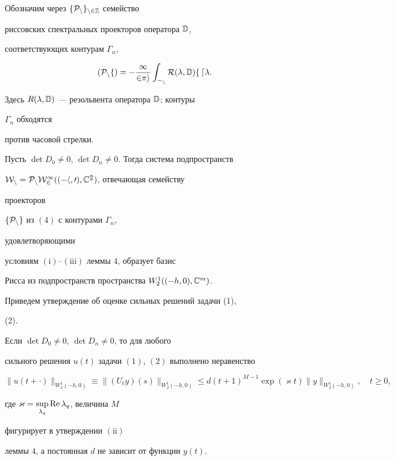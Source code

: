  


Обозначим через $\{\cal P_n\}_{n\in\Bbb Z}$ семейство 


риссовских спектральных проекторов оператора $\Bbb D$,


соответствующих контурам $\Gamma_n$,


\begin{equation} 


(\cal P_n f)=-\frac{1}{2\pi i}\int_{\Gamma_n} 


R(\lambda,\Bbb D)f\,d\lambda. 


\end{equation} 


Здесь $R(\lambda,\Bbb D)$ --- резольвента оператора $\Bbb D$; контуры 


$\Gamma_n$ обходятся 


против часовой стрелки. 


 


\begin{thm} 


Пусть $\det D_0\ne0$, $\det D_n\ne0$. Тогда система подпространств 


$\cal W_n=\linebreak \cal P_n W^1_2((-h,0),\Bbb C^m)$, отвечающая семейству 


проекторов 


$\{\cal P_n\}$ из $(4)$ с контурами $\Gamma_n$, 


удовлетворяющими 


условиям $(\mathrm{i})$--$(\mathrm{iii})$ леммы $4$, образует базис 


Рисса из подпространств пространства $W^1_2((-h,0),\Bbb C^m)$. 


\end{thm} 


 


Приведем утверждение об оценке сильных решений задачи (1),


(2). 


 


\begin{thm} 


Если $\det D_0\ne0$, $\det D_n\ne0$, то для любого 


сильного решения $u(t)$ задачи $(1)$, $(2)$ выполнено неравенство 


\begin{equation} 


\|u(t+\cdot)\|_{W^1_2(-h,0)}\equiv 


\|(U_t y)(s)\|_{W^1_2(-h,0)}\le d(t+1)^{M-1} 


\exp(\varkappa t)\|y\|_{W^1_2(-h,0)},\quad t\ge0,


\end{equation} 


где $\varkappa=\sup\limits_{\lambda_q}\operatorname{Re}\lambda_q$, величина $M$ 


фигурирует в утверждении $(\mathrm{ii})$ 


леммы $4$, а постоянная $d$ не зависит от функции $y(t)$. 


\end{thm} 


